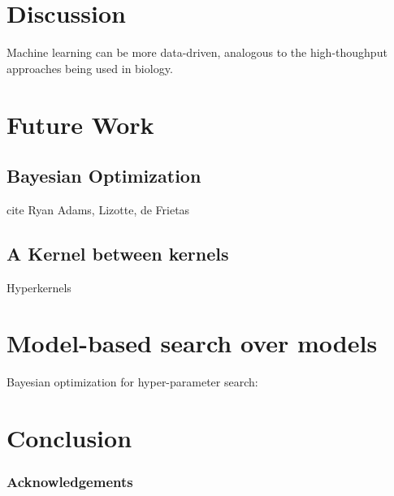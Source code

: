 \documentclass[twoside]{article}
\theoremstyle{definition}
\theoremstyle{remark}
\numberwithin{equation}{section}
\numberwithin{thm}{section}
\begin{document}
\section{Discussion}

Machine learning can be more data-driven, analogous to the high-thoughput approaches being used in biology. 

\section{Future Work}
\subsection{Bayesian Optimization}

cite Ryan Adams, Lizotte, de Frietas

\subsection{A Kernel between kernels}

Hyperkernels \cite{ong2002hyperkernels}
\section{Model-based search over models}

Bayesian optimization for hyper-parameter search: \cite{snoek2012practical}

\section{Conclusion}

\subsubsection*{Acknowledgements}




\end{document}

